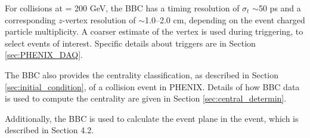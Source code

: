 For \pau collisions at \sqsn = 200 GeV, the BBC has a timing resolution of $\sigma_t$ $\sim$50 ps and a corresponding $z$-vertex resolution of $\sim$1.0--2.0 cm, depending on the event charged particle multiplicity. A coarser estimate of the vertex is used during triggering, to select events of interest. Specific details about triggers are in Section \ref{sec:PHENIX_DAQ}.

The BBC also provides the centrality classification, as described in Section \ref{sec:initial_condition}, of a collision event in PHENIX. Details of how BBC data is used to compute the centrality are given in Section \ref{sec:central_determin}.

Additionally, the BBC is used to calculate the event plane in the event, which is described in Section 4.2.
